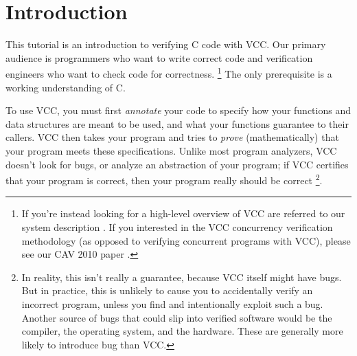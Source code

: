 \section{Introduction}
This tutorial is an introduction to verifying C code with VCC. Our
primary audience is programmers who want to write correct code and
verification engineers who want to check code for correctness.%
\footnote{
  If you're instead looking for a high-level overview of VCC are
  referred to our system description \cite{vcc}.
  If you interested in the VCC concurrency verification
  methodology (as opposed to verifying concurrent programs with VCC),
  please see our CAV 2010 paper \cite{lci}.
}
The
only prerequisite is a working understanding of C. 

To use VCC, you must first \emph{annotate} your code to specify how
your functions and data structures are meant to be used, and what your
functions guarantee to their callers.
VCC then
takes your program and tries to \emph{prove} (mathematically) that
your program meets these specifications.  Unlike most program
analyzers, VCC doesn't look for bugs, or analyze an abstraction of
your program; if VCC certifies that your program is correct, then your
program really should be correct
\footnote{
  In reality, this isn't
  really a guarantee, because VCC itself might have bugs. But in
  practice, this is unlikely to cause you to accidentally verify an
  incorrect program, unless you find and intentionally exploit such a
  bug. 
  Another source of bugs that could slip into verified software would be the compiler,
  the operating system, and the hardware. 
  These are generally more likely to introduce bug than VCC.
  }. 


